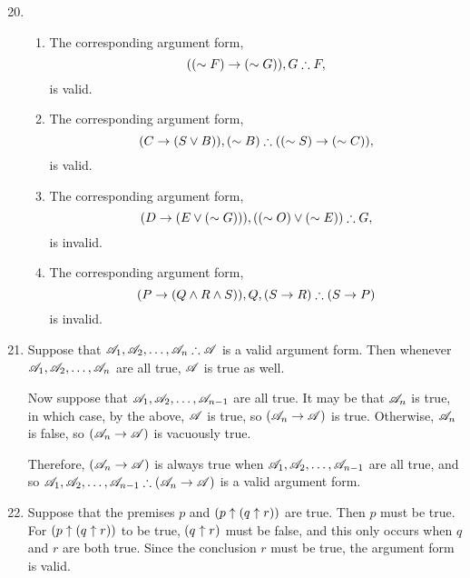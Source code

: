 \solutions{}

\begin{enumerate}
  \setcounter{enumi}{19}
  \item %
    \begin{enumerate}[label = (\alph*), align = left]
      \item The corresponding argument form,
          \[((\sim F) \rightarrow (\sim G)), G \therefore F,\]
        is valid.

      \item The corresponding argument form,
          \[(C \rightarrow (S \lor B)), (\sim B) \therefore ((\sim S) \rightarrow (\sim C)),\]
        is valid.

      \item The corresponding argument form,
          \[(D \rightarrow (E \lor (\sim G))), ((\sim O) \lor (\sim E)) \therefore G,\]
        is invalid.

      \item The corresponding argument form,
          \[(P \rightarrow (Q \land R \land S)), Q, (S \rightarrow R) \therefore (S \rightarrow P)\]
        is invalid.
    \end{enumerate}

  \item %
    Suppose that \(\mathscr{A}_1, \mathscr{A}_2, \dots, \mathscr{A}_n \therefore \mathscr{A}\) is a valid argument form. Then whenever \(\mathscr{A}_1, \mathscr{A}_2, \dots, \mathscr{A}_n\) are all true, \(\mathscr{A}\) is true as well.

    Now suppose that \(\mathscr{A}_1, \mathscr{A}_2, \dots, \mathscr{A}_{n-1}\) are all true. It may be that \(\mathscr{A}_n\) is true, in which case, by the above, \(\mathscr{A}\) is true, so \((\mathscr{A}_n \rightarrow \mathscr{A})\) is true. Otherwise, \(\mathscr{A}_n\) is false, so \((\mathscr{A}_n \rightarrow \mathscr{A})\) is vacuously true. 

    Therefore, \((\mathscr{A}_n \rightarrow \mathscr{A})\) is always true when \(\mathscr{A}_1, \mathscr{A}_2, \dots, \mathscr{A}_{n-1}\) are all true, and so \(\mathscr{A}_1, \mathscr{A}_2, \dots, \mathscr{A}_{n-1} \therefore (\mathscr{A}_n \rightarrow \mathscr{A})\) is a valid argument form.

  \item %
    Suppose that the premises \(p\) and \((p \uparrow (q \uparrow r))\) are true. Then \(p\) must be true. For \((p \uparrow (q \uparrow r))\) to be true, \((q \uparrow r)\) must be false, and this only occurs when \(q\) and \(r\) are both true. Since the conclusion \(r\) must be true, the argument form is valid.
\end{enumerate}
